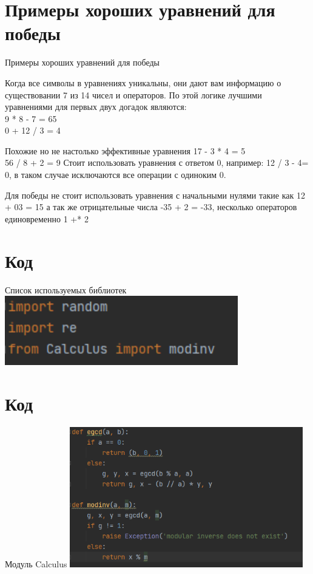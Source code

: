 \documentclass[handout]{beamer}
\begin{document}
    \section{Примеры хороших уравнений для победы}
     \begin{frame}{Примеры хороших уравнений для победы}
     
        \item Когда все символы в уравнениях уникальны, они дают вам информацию о существовании 7 из 14 чисел и операторов. По этой логике лучшими уравнениями для первых двух догадок являются:\\9 * 8 - 7 = 65 \\0 + 12 / 3 = 4
        \item Похожие но не настолько эффективные уравнения 17 - 3 * 4 = 5 \\56 / 8 + 2 = 9
        Стоит использовать уравнения с ответом 0, например: 12 / 3 - 4= 0, в таком случае исключаются все операции с одиноким 0.
        \item Для победы не стоит использовать уравнения с начальными нулями такие как 12 + 03 = 15
        а так же отрицательные числа -35 + 2 = -33, несколько операторов единовременно 1 +* 2
    \end{frame}

    \section{Код}
    \begin{frame}{Список используемых библиотек}
        \centering\includegraphics[width=4in, keepaspectratio]{Библиотеки.png}
    \end{frame}
    \section{}
    
    \section{Код}
    \begin{frame}{Модуль Calculus}      
        \centering\includegraphics[width=4in, keepaspectratio]{Calculus.png}
    \end{frame}
    
\end{document}
